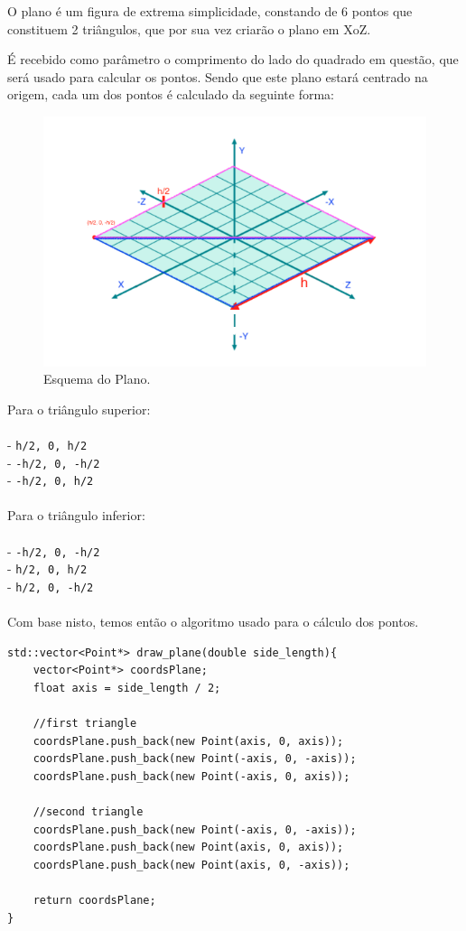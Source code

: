 \documentclass[a4paper]{article}
\begin{document}
O plano é um figura de extrema simplicidade, constando de 6 pontos que constituem 2 triângulos, que por sua vez criarão o plano em XoZ.



É recebido como parâmetro o comprimento do lado do quadrado em questão, que será usado para calcular os pontos. Sendo que este plano estará centrado na origem, cada um dos pontos é calculado da seguinte forma:
\\
\begin{figure}[H]
\centering
\includegraphics[width=0.5\linewidth]{esquemaPlano.PNG}
\caption{Esquema do Plano.}
\end{figure}
\pagebreak

Para o triângulo superior:\\
\\
-  \texttt{h/2, 0, h/2}\\
-  \texttt{-h/2, 0, -h/2}\\
-  \texttt{-h/2, 0, h/2}\\
\\
Para o triângulo inferior:\\
\\
-  \texttt{-h/2, 0, -h/2}\\
-  \texttt{h/2, 0, h/2}\\
-  \texttt{h/2, 0, -h/2}\\
\\
Com base nisto, temos então o algoritmo usado para o cálculo dos pontos.\\
\begin{lstlisting}
std::vector<Point*> draw_plane(double side_length){
    vector<Point*> coordsPlane;
    float axis = side_length / 2;

    //first triangle
    coordsPlane.push_back(new Point(axis, 0, axis));
    coordsPlane.push_back(new Point(-axis, 0, -axis));
    coordsPlane.push_back(new Point(-axis, 0, axis));

    //second triangle
    coordsPlane.push_back(new Point(-axis, 0, -axis));
    coordsPlane.push_back(new Point(axis, 0, axis));
    coordsPlane.push_back(new Point(axis, 0, -axis));

    return coordsPlane;
}

\end{lstlisting}
\end{document}
